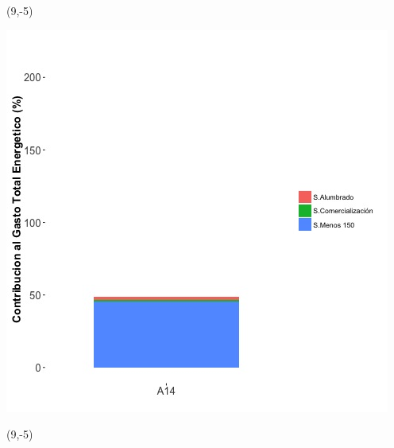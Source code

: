 \documentclass{article}\usepackage[]{graphicx}\usepackage[]{color}
\newenvironment{knitrout}{}{} %
\begin{document}
 \begin{textblock}{1}(9,-5)
\begin{minipage}{20em}
\begingroup

\endgroup
\end{minipage}
\end{textblock}

\begin{knitrout}
\color{fgcolor}
\includegraphics[scale=0.65]{figure/A14_subvars_plot.jpg} 
\end{knitrout}

 \begin{textblock}{1}(9,-5)
\begin{minipage}{20em}
\begingroup

\endgroup
\end{minipage}
\end{textblock}
\end{document}

